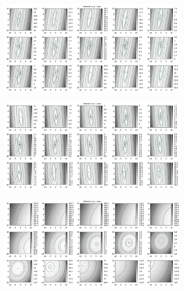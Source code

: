 \begin{appendix}
\begin{figure}[!ht]
\begin{subfigure}[t]{0.3\textwidth}
	\end{subfigure}
\\
	\centering
	\begin{subfigure}[t]{0.3\textwidth}
	     \centering
	     \includegraphics[width=\textwidth]{img/fitness/xy/a2.png}
	\end{subfigure}
	\begin{subfigure}[t]{0.3\textwidth}
		\centering
	     \includegraphics[width=\textwidth]{img/fitness/xz/a2.png}
	\end{subfigure}
	\begin{subfigure}[t]{0.3\textwidth}
			\centering
	   \includegraphics[width=\textwidth]{img/fitness/yz/a2.png}

\end{subfigure}
\end{figure}
\end{appendix}
